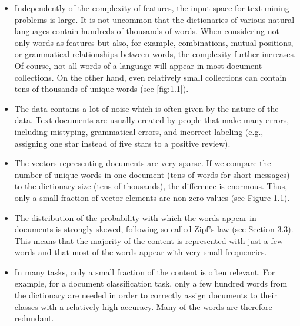 \documentclass[11pt,openany,executivepaper]{book}
\begin{document}
\begin{itemize}
  \item Independently of the complexity of features, the input space for text mining problems is large. It is not uncommon that the dictionaries of various natural languages contain hundreds of thousands of words. When considering not only words as features but also, for example, combinations, mutual positions, or grammatical relationships between words, the complexity further increases. Of course, not all words of a language will appear in most document collections. On the other hand, even relatively small collections can contain tens of thousands of unique words (see \ref{fig:1.1}).
  \item The data contains a lot of noise which is often given by the nature of the data. Text documents are usually created by people that make many errors, including mistyping, grammatical errors, and incorrect labeling (e.g., assigning one star instead of five stars to a positive review).
  \item The vectors representing documents are very sparse. If we compare the number of unique words in one document (tens of words for short messages) to the dictionary size (tens of thousands), the difference is enormous. Thus, only a small fraction of vector elements are non-zero values (see Figure 1.1).
  \item The distribution of the probability with which the words appear in documents is strongly skewed, following so called Zipf's law (see Section 3.3). This means that the majority of the content is represented with just a few words and that most of the words appear with very small frequencies.
  \item In many tasks, only a small fraction of the content is often relevant. For example, for a document classification task, only a few hundred words from the dictionary are needed in order to correctly assign documents to their classes with a relatively high accuracy. Many of the words are therefore redundant.  
\begin{figure}[ht]
  

\end{figure}
\end{itemize}
\end{document}
